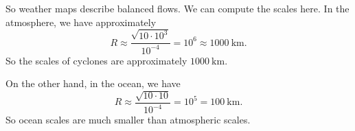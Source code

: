 \documentclass[a4paper]{article}
\begin{document}
So weather maps describe balanced flows. We can compute the scales here. In the atmosphere, we have approximately
\[
  R \approx \frac{\sqrt{10 \cdot 10^3}}{10^{-4}} = 10^6 \approx \SI{1000}{\kilo\meter}.
\]
So the scales of cyclones are approximately $\SI{1000}{\kilo\meter}$.

On the other hand, in the ocean, we have
\[
  R \approx \frac{\sqrt{10 \cdot 10}}{10^{-4}} = 10^5 = \SI{100}{\kilo\meter}.
\]
So ocean scales are much smaller than atmospheric scales.
\end{document}
